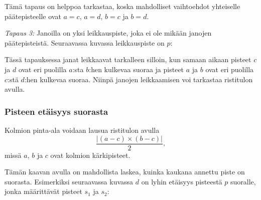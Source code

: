Tämä tapaus on helppoa tarkastaa,
koska mahdolliset vaihtoehdot
yhteiselle päätepisteelle ovat
$a=c$, $a=d$, $b=c$ ja $b=d$.

\textit{Tapaus 3:}
Janoilla on yksi leikkauspiste,
joka ei ole mikään janojen päätepisteistä.
Seuraavassa kuvassa leikkauspiste on $p$:
\begin{center}
\end{center}

Tässä tapauksessa janat leikkaavat
tarkalleen silloin, kun samaan aikaan
pisteet $c$ ja $d$ ovat eri puolilla
$a$:sta $b$:hen kulkevaa suoraa
ja pisteet $a$ ja $b$
ovat eri puolilla 
$c$:stä $d$:hen kulkevaa suoraa.
Niinpä janojen leikkaamisen voi tarkastaa
ristitulon avulla.

% 


\subsubsection{Pisteen etäisyys suorasta}

Kolmion pinta-ala voidaan lausua
ristitulon avulla
\[\frac{| (a-c) \times (b-c) |}{2},\]
missä $a$, $b$ ja $c$ ovat kolmion kärkipisteet.

Tämän kaavan avulla on mahdollista laskea,
kuinka kaukana annettu piste on suorasta.
Esimerkiksi seuraavassa kuvassa $d$
on lyhin etäisyys pisteestä $p$ suoralle,
jonka määrittävät pisteet $s_1$ ja $s_2$:
\begin{center}
\end{center}

